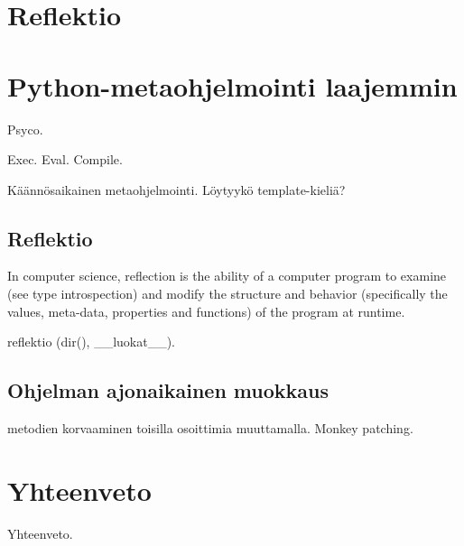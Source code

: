 \documentclass[finnish]{tktltiki2}
\theoremstyle{definition}
\theoremstyle{remark}
\begin{document}


\section{Reflektio}

\cite{dive-into-python}

\section{Python-metaohjelmointi laajemmin}

Psyco.

Exec. Eval. Compile.

Käännösaikainen metaohjelmointi. Löytyykö template-kieliä?

\subsection{Reflektio}

In computer science, reflection is the ability of a computer program to examine (see type introspection) and modify the structure and behavior (specifically the values, meta-data, properties and functions) of the program at runtime.

reflektio (dir(), \_\_luokat\_\_). 




\subsection{Ohjelman ajonaikainen muokkaus}

metodien korvaaminen toisilla osoittimia muuttamalla. Monkey patching.

\section{Yhteenveto}

Yhteenveto.


\pagebreak

%
%
% 
%




\lastpage
\end{document}
